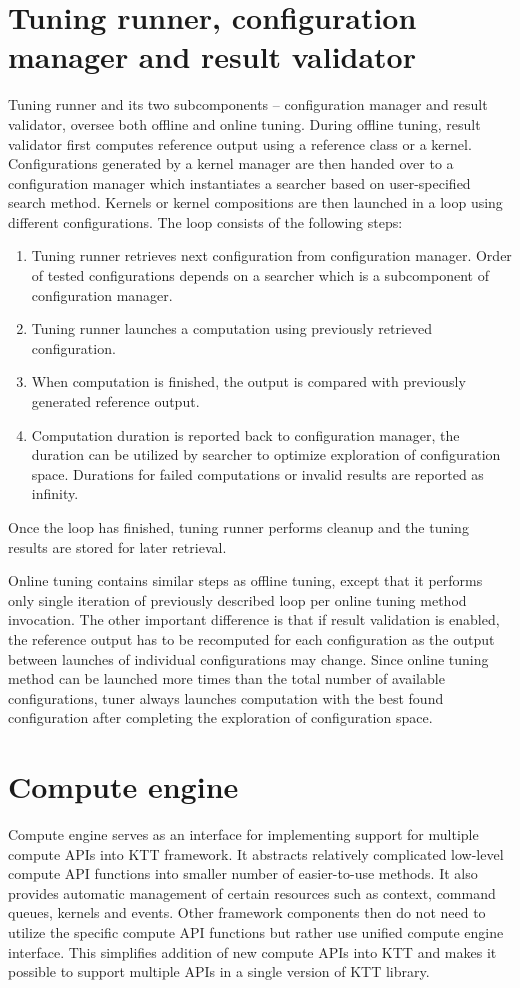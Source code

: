 \documentclass
[
    digital, %
    oneside, %
    table, %
    nolof, %
    nolot, %
    nocover %
]{fithesis3}
\begin{document}
\section{Tuning runner, configuration manager and result validator}
Tuning runner and its two subcomponents -- configuration manager and result validator, oversee both offline and online tuning. During offline tuning,
result validator first computes reference output using a reference class or a kernel. Configurations generated by a kernel manager are then handed over to
a configuration manager which instantiates a searcher based on user-specified search method. Kernels or kernel compositions are then launched in a loop
using different configurations. The loop consists of the following steps:
\begin{enumerate}
    \item Tuning runner retrieves next configuration from configuration manager. Order of tested configurations depends on a searcher which is
    a subcomponent of configuration manager.
    \item Tuning runner launches a computation using previously retrieved configuration.
    \item When computation is finished, the output is compared with previously generated reference output.
    \item Computation duration is reported back to configuration manager, the duration can be utilized by searcher to optimize exploration of
    configuration space. Durations for failed computations or invalid results are reported as infinity.
\end{enumerate}
Once the loop has finished, tuning runner performs cleanup and the tuning results are stored for later retrieval.

Online tuning contains similar steps as offline tuning, except that it performs only single iteration of previously described loop per online tuning
method invocation. The other important difference is that if result validation is enabled, the reference output has to be recomputed for each
configuration as the output between launches of individual configurations may change. Since online tuning method can be launched more times than the
total number of available configurations, tuner always launches computation with the best found configuration after completing the exploration of
configuration space.

\section{Compute engine}
Compute engine serves as an interface for implementing support for multiple compute APIs into KTT framework. It abstracts relatively complicated
low-level compute API functions into smaller number of easier-to-use methods. It also provides automatic management of certain resources such as context,
command queues, kernels and events. Other framework components then do not need to utilize the specific compute API functions but rather use unified
compute engine interface. This simplifies addition of new compute APIs into KTT and makes it possible to support multiple APIs in a single version of
KTT library.
\end{document}
